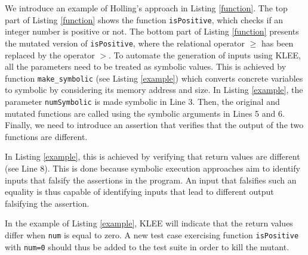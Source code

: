 We introduce an example of Holling's approach in Listing \ref{function}. The top part of Listing \ref{function} shows the function \texttt{isPositive}, which checks if an integer number is positive or not. The bottom part of Listing \ref{function} presents the mutated version of \texttt{isPositive}, where the relational operator $\geq$ has been replaced by the operator $>$.
To automate the generation of inputs using KLEE, all the parameters need to be treated as symbolic values.
This is achieved by function \texttt{make\_symbolic} (see Listing \ref{example}) which converts concrete variables to symbolic by considering its memory address and size. 
In Listing \ref{example}, the parameter \texttt{numSymbolic} is made symbolic in Line 3. Then, the original and mutated functions are called using the symbolic arguments in Lines 5 and 6.
Finally, we need to introduce an assertion that verifies that the output of the two functions are different. 

In Listing \ref{example}, this is achieved by verifying that return values are different (see Line 8). 
This is done because symbolic execution approaches aim to identify inputs that falsify the assertions in the program. 
An input that falsifies such an equality is thus capable of identifying inputs that lead to different output falsifying the assertion.

In the example of Listing \ref{example}, KLEE will indicate that the return values differ when \texttt{num} is equal to zero.
A new test case exercising function \texttt{isPositive} with \texttt{num=0} should thus be added to the test suite in order to kill the mutant.



